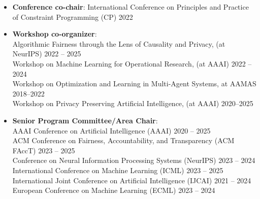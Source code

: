 \documentclass[localFont,alternative]{metadataShortBio}
\begin{document}

  \begin{itemize}[leftmargin=0.4cm]
    \item {\bf Conference co-chair}:  
    {International Conference on Principles and Practice of Constraint Programming (CP)}  \hfill{2022}


    \item {\bf Workshop co-organizer}: \\
    {Algorithmic Fairness through the Lens of Causality and Privacy, (at NeurIPS)} \hfill{2022 -- 2025}\\
    {Workshop on Machine Learning for Operational Research, (at AAAI)}   \hfill{2022 -- 2024}\\
    {Workshop on Optimization and Learning in Multi-Agent Systems, at AAMAS} \hfill{2018--2022}\\
    {Workshop on Privacy Preserving Artificial Intelligence, (at AAAI)}   \hfill{2020--2025}
    
    \item {\bf Senior Program Committee/Area Chair}: \\
    AAAI Conference on Artificial Intelligence (AAAI) \hfill {2020 -- 2025}\\
		ACM Conference on Fairness, Accountability, and Transparency (ACM FAccT) \hfill {2023 -- 2025}\\
    Conference on Neural Information Processing Systems (NeurIPS) \hfill{2023 -- 2024}\\
    International Conference on Machine Learning (ICML) \hfill {2023 -- 2025}\\
    International Joint Conference on Artificial Intelligence (IJCAI) \hfill {2021 -- 2024}\\
    European Conference on Machine Learning (ECML) \hfill{2023 -- 2024}


 
  \end{itemize}
\end{document}
